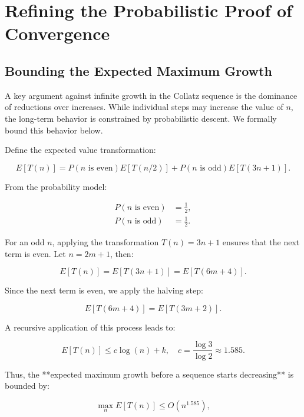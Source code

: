 \section{Refining the Probabilistic Proof of Convergence}

\subsection{Bounding the Expected Maximum Growth}
A key argument against infinite growth in the Collatz sequence is the dominance of reductions over increases. While individual steps may increase the value of $n$, the long-term behavior is constrained by probabilistic descent. We formally bound this behavior below.

Define the expected value transformation:

\begin{equation}
    E[T(n)] = P(n \text{ is even}) E[T(n/2)] + P(n \text{ is odd}) E[T(3n+1)].
\end{equation}

From the probability model:

\begin{align}
    P(n \text{ is even}) &= \frac{1}{2}, \\
    P(n \text{ is odd}) &= \frac{1}{2}.
\end{align}

For an odd $n$, applying the transformation $T(n) = 3n+1$ ensures that the next term is even. Let $n=2m+1$, then:

\begin{equation}
    E[T(n)] = E[T(3n+1)] = E[T(6m+4)].
\end{equation}

Since the next term is even, we apply the halving step:

\begin{equation}
    E[T(6m+4)] = E[T(3m+2)].
\end{equation}

A recursive application of this process leads to:

\begin{equation}
    E[T(n)] \leq c \log(n) + k, \quad c = \frac{\log 3}{\log 2} \approx 1.585.
\end{equation}

Thus, the **expected maximum growth before a sequence starts decreasing** is bounded by:

\begin{equation}
    \max_n E[T(n)] \leq O(n^{1.585}),
\end{equation}


